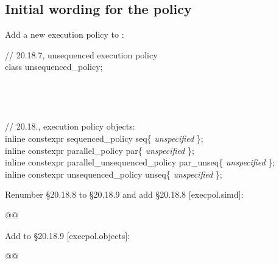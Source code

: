 \subsection{Initial wording for the policy}

Add a new execution policy to \citep[§20.18.2]{N4842}:
\begin{wgText}
  \begingroup
  \ttfamily
  // 20.18.7, unsequenced execution policy\\
  class unsequenced_policy;\\
  \\
  \\
  \\
  \\
  // 20.18., execution policy objects:\\
  inline constexpr sequenced_policy seq\{ \textit{unspecified} \};\\
  inline constexpr parallel_policy par\{ \textit{unspecified} \};\\
  inline constexpr parallel_unsequenced_policy par_unseq\{ \textit{unspecified} \};\\
  inline constexpr unsequenced_policy unseq\{ \textit{unspecified} \};\\
  \endgroup
\end{wgText}

Renumber §20.18.8 to §20.18.9 and add §20.18.8 [execpol.simd]:
\begin{wgText}
  \begin{itemdecl}
@@
  \end{itemdecl}
  \begin{itemdescr}
    \pnum{}

    \pnum{}
  \end{itemdescr}
\end{wgText}

Add to §20.18.9 [execpol.objects]:
\begin{itemdecl}
@@
\end{itemdecl}

